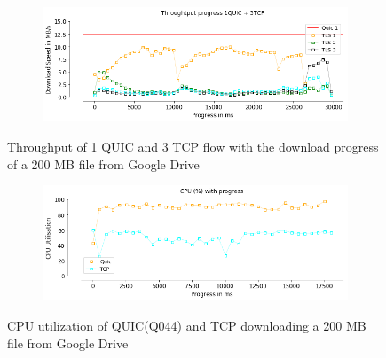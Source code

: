 \begin{frame}



\begin{figure}[!htb]
    \centering
    \begin{subfigure}{0.5\textwidth}
        \includegraphics[width=\linewidth]{./plots/PI/throughput/Throughtputprogress1QUIC+3TCP.png}
    \end{subfigure}    
    \caption{Throughput of 1 QUIC and 3 TCP flow with the download progress of a 200 MB file from Google Drive}
\end{figure}
\end{frame}
\clearpage

\begin{frame}

\begin{figure}[!htb]
    \centering
    \begin{subfigure}{0.5\textwidth}
        \includegraphics[width=\linewidth]{./plots/PI/cpu/cpupercentprogress.png}
    \end{subfigure}
    
    \caption{CPU utilization of QUIC(Q044) and TCP downloading a 200 MB file from Google Drive}\label{fig:cpu-utilization-of}
\end{figure}

\end{frame}
\clearpage

